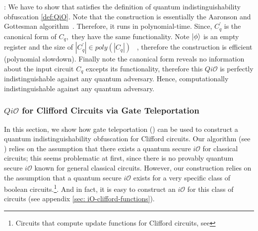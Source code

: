 : We have to show that  satisfies the definition of quantum indistinguishability obfuscation \ref{def:QiO}. Note that the construction is essentially the Aaronson and Gottesman  algorithm~\cite{AG04}. Therefore, it runs in polynomial-time.
Since,  $C_q^\prime$ is the canonical form of $C_q,$ they have the same functionality. Note ${\lvert}\phi\rangle$ is an empty register and the size of $|C_q^\prime| \in poly(|C_q|)$ ~\cite{AG04}, therefore the construction is efficient (polynomial slowdown). Finally note the canonical form reveals no information about the input circuit $C_q$ excepts its functionality, therefore this $Qi\mathcal{O}$ is perfectly indistinguishable against any quantum adversary. Hence, computationally indistinguishable against any quantum adversary.



\subsubsection{$Qi\mathcal{O}$ for Clifford Circuits via Gate Teleportation}
\label{sec:Clifford-iO-teleportaion}
In this section, we  show how gate teleportation () can be used to construct a quantum indistinguishability obfuscation for Clifford circuits. Our algorithm (see ) relies on the assumption that there exists a quantum secure $i\mathcal{O}$ for classical circuits; this seems problematic at first, since there is no provably quantum secure $i\mathcal{O}$ known for general classical circuits.
However,  our construction relies on the assumption that a quantum secure $i\mathcal{O}$ exists for a very specific class of boolean circuits.\footnote{Circuits that compute update functions for Clifford circuits, see }.  And in fact, it is easy to construct an $i\mathcal{O}$ for this class of circuits (see appendix \ref{sec: iO-clifford-functions}). %



